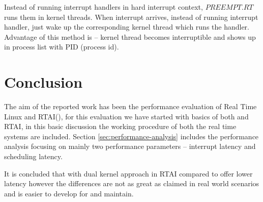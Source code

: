 Instead of running interrupt handlers in hard interrupt context, $ PREEMPT.RT $ runs them in kernel threads. When interrupt arrives, instead of running interrupt handler, just wake up the corresponding kernel thread which runs the handler. Advantage of this method is -- kernel thread becomes interruptible and shows up in process list with PID (process id).

\section{Conclusion}
The aim of the reported work has been the  performance evaluation of Real Time Linux and RTAI(\rtai), for this evaluation we have started with basics of both \rtlinux \space and RTAI, in this basic discussion the working procedure of both the real time systems are included. Section \ref{sec:performance-analysis} includes the performance analysis focusing on mainly two performance parameters -- interrupt latency and scheduling latency.

It is concluded that with dual kernel approach in RTAI compared to \rtlinux \space offer lower latency however the differences are not as great as claimed in real world scenarios and \rtlinux \space is easier to develop for and maintain.
